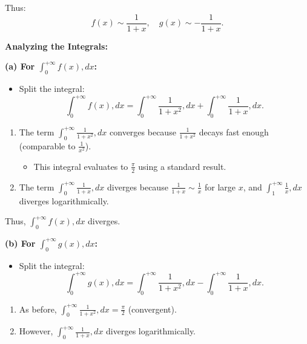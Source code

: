 \documentclass[a4paper,12pt]{book}
\begin{document}
Thus:
\[
f(x) \sim \frac{1}{1+x}, \quad g(x) \sim -\frac{1}{1+x}.
\]

\hrulefill

\textbf{Analyzing the Integrals:}

\textbf{(a) For \( \int_0^{+\infty} f(x) , dx \):}

\begin{itemize}
\item 
Split the integral:
\[
\int_0^{+\infty} f(x) , dx = \int_0^{+\infty} \frac{1}{1+x^2} , dx + \int_0^{+\infty} \frac{1}{1+x} , dx.
\]

\end{itemize}
\begin{enumerate}
\item 
The term \( \int_0^{+\infty} \frac{1}{1+x^2} , dx \) converges because \( \frac{1}{1+x^2} \) decays fast enough (comparable to \( \frac{1}{x^2} \)).
\begin{itemize}
\item 
This integral evaluates to \( \frac{\pi}{2} \) using a standard result.

\end{itemize}

\item 
The term \( \int_0^{+\infty} \frac{1}{1+x} , dx \) diverges because \( \frac{1}{1+x} \sim \frac{1}{x} \) for large \( x \), and \( \int_1^{+\infty} \frac{1}{x} , dx \) diverges logarithmically.

\end{enumerate}

Thus, \( \int_0^{+\infty} f(x) , dx \) diverges.

\hrulefill

\textbf{(b) For \( \int_0^{+\infty} g(x) , dx \):}

\begin{itemize}
\item 
Split the integral:
\[
\int_0^{+\infty} g(x) , dx = \int_0^{+\infty} \frac{1}{1+x^2} , dx - \int_0^{+\infty} \frac{1}{1+x} , dx.
\]

\end{itemize}
\begin{enumerate}
\item 
As before, \( \int_0^{+\infty} \frac{1}{1+x^2} , dx = \frac{\pi}{2} \) (convergent).

\item 
However, \( \int_0^{+\infty} \frac{1}{1+x} , dx \) diverges logarithmically.

\end{enumerate}
\end{document}
